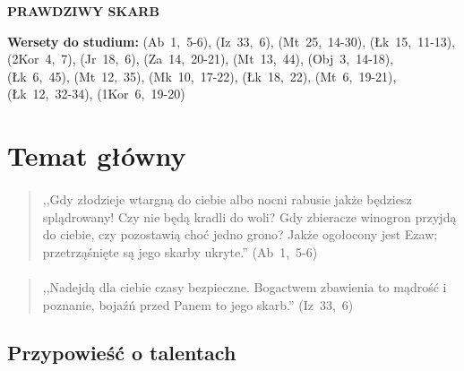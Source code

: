 \documentclass[10pt,a4paper,oneside]{article}
\begin{document}
\centerline{\textbf{\MakeUppercase{Prawdziwy skarb}}}
\begin{center}
\textbf{Wersety do studium:} 
\mbox{(Ab 1, 5-6)}, \mbox{(Iz 33, 6)}, \mbox{(Mt 25, 14-30)}, \mbox{(Łk 15, 11-13)}, \mbox{(2Kor 4, 7)}, \mbox{(Jr 18, 6)}, \mbox{(Za 14, 20-21)}, \mbox{(Mt 13, 44)}, \mbox{(Obj 3, 14-18)}, \mbox{(Łk 6, 45)}, \mbox{(Mt 12, 35)}, \mbox{(Mk 10, 17-22)}, \mbox{(Łk 18, 22)}, \mbox{(Mt 6, 19-21)}, \mbox{(Łk 12, 32-34)}, \mbox{(1Kor 6, 19-20)}
\end{center}
\section{Temat główny}
\paragraph{}
\begin{quote}
,,Gdy złodzieje wtargną do ciebie albo nocni rabusie jakże będziesz splądrowany! Czy nie będą kradli do woli? Gdy zbieracze winogron przyjdą do ciebie, czy pozostawią choć jedno grono? Jakże ogołocony jest Ezaw; przetrząśnięte są jego skarby ukryte.'' \mbox{(Ab 1, 5-6)}
\end{quote}
\paragraph{}
\begin{quote}
,,Nadejdą dla ciebie czasy bezpieczne. Bogactwem zbawienia to mądrość i poznanie, bojaźń przed Panem to jego skarb.'' \mbox{(Iz 33, 6)}
\end{quote}
\subsection{Przypowieść o talentach}
\end{document}
